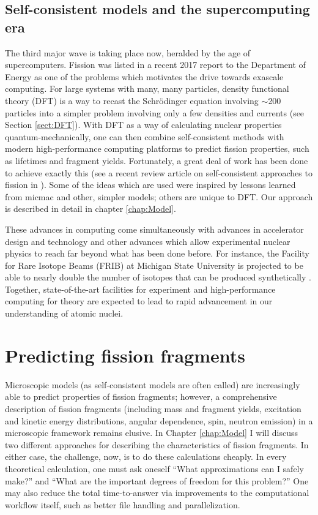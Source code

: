 \subsection{Self-consistent models and the supercomputing era}
The third major wave is taking place now, heralded by the age of supercomputers. Fission was listed in a recent 2017 report to the Department of Energy \cite{Carlson2017} as one of the problems which motivates the drive towards exascale computing. For large systems with many, many particles, density functional theory (DFT) is a way to recast the Schr\"{o}dinger equation involving $\sim$200 particles into a simpler problem involving only a few densities and currents (see Section \ref{sect:DFT}). With DFT as a way of calculating nuclear properties quantum-mechanically, one can then combine self-consistent methods with modern high-performance computing platforms to predict fission properties, such as lifetimes and fragment yields. Fortunately, a great deal of work has been done to achieve exactly this (see a recent review article on self-consistent approaches to fission in \cite{Schunck2016}). Some of the ideas which are used were inspired by lessons learned from micmac and other, simpler models; others are unique to DFT. Our approach is described in detail in chapter \ref{chap:Model}.

These advances in computing come simultaneously with advances in accelerator design and technology and other advances which allow experimental nuclear physics to reach far beyond what has been done before. For instance, the Facility for Rare Isotope Beams (FRIB) at Michigan State University is projected to be able to nearly double the number of isotopes that can be produced synthetically \cite{Baumann2016}. Together, state-of-the-art facilities for experiment and high-performance computing for theory are expected to lead to rapid advancement in our understanding of atomic nuclei.

\section{Predicting fission fragments}
Microscopic models (as self-consistent models are often called) are increasingly able to predict properties of fission fragments; however, a comprehensive description of fission fragments (including mass and fragment yields, excitation and kinetic energy distributions, angular dependence, spin, neutron emission) in a microscopic framework remains elusive. In Chapter \ref{chap:Model} I will discuss two different approaches for describing the characteristics of fission fragments. In either case, the challenge, now, is to do these calculations cheaply. In every theoretical calculation, one must ask oneself ``What approximations can I safely make?'' and ``What are the important degrees of freedom for this problem?'' One may also reduce the total time-to-answer via improvements to the computational workflow itself, such as better file handling and parallelization.

